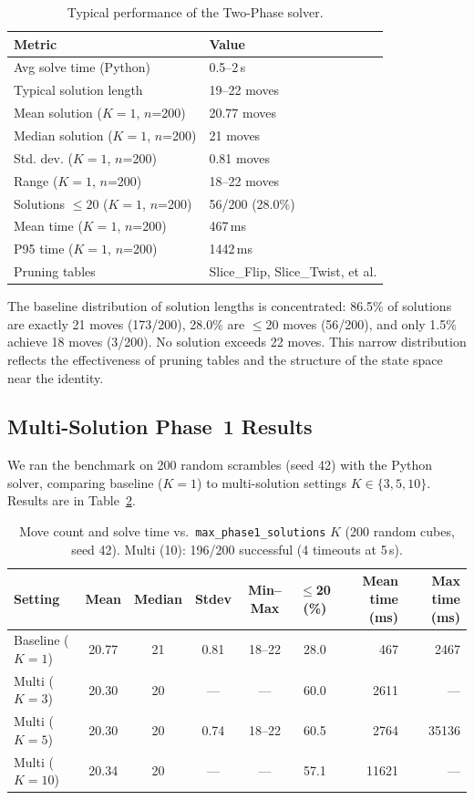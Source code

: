 \documentclass[10pt,twocolumn,a4paper]{article}
\begin{document}
\begin{table}[t]
\centering
\caption{Typical performance of the Two-Phase solver.}
\label{tab:baseline}
\begin{tabular}{@{}ll@{}}
\toprule
\textbf{Metric} & \textbf{Value} \\
\midrule
Avg solve time (Python) & 0.5--2\,s \\
Typical solution length & 19--22 moves \\
Mean solution ($K{=}1$, $n$=200) & 20.77 moves \\
Median solution ($K{=}1$, $n$=200) & 21 moves \\
Std. dev. ($K{=}1$, $n$=200) & 0.81 moves \\
Range ($K{=}1$, $n$=200) & 18--22 moves \\
Solutions $\leq 20$ ($K{=}1$, $n$=200) & 56/200 (28.0\%) \\
Mean time ($K{=}1$, $n$=200) & 467\,ms \\
P95 time ($K{=}1$, $n$=200) & 1442\,ms \\
Pruning tables & Slice\_Flip, Slice\_Twist, et al. \\
\bottomrule
\end{tabular}
\end{table}

The baseline distribution of solution lengths is concentrated: 86.5\% of solutions are exactly 21 moves (173/200), 28.0\% are $\leq$20 moves (56/200), and only 1.5\% achieve 18 moves (3/200). No solution exceeds 22 moves. This narrow distribution reflects the effectiveness of pruning tables and the structure of the state space near the identity.

\subsection{Multi-Solution Phase~1 Results}
\label{sec:multi-results}

We ran the benchmark on 200 random scrambles (seed 42) with the Python solver, comparing baseline ($K=1$) to multi-solution settings $K \in \{3, 5, 10\}$. Results are in Table~\ref{tab:benchmark}.

\begin{table}[t]
\centering
\caption{Move count and solve time vs.\ \texttt{max\_phase1\_solutions} $K$ (200 random cubes, seed 42). Multi (10): 196/200 successful (4 timeouts at 5\,s).}
\label{tab:benchmark}
\begin{tabular}{@{}lcccccrr@{}}
\toprule
\textbf{Setting} & \textbf{Mean} & \textbf{Median} & \textbf{Stdev} & \textbf{Min--Max} & \textbf{$\leq$20 (\%)} & \textbf{Mean time (ms)} & \textbf{Max time (ms)} \\
\midrule
Baseline ($K=1$)  & 20.77 & 21 & 0.81 & 18--22 & 28.0 & 467 & 2467 \\
Multi ($K=3$)     & 20.30 & 20 & --- & --- & 60.0 & 2611 & --- \\
Multi ($K=5$)     & 20.30 & 20 & 0.74 & 18--22 & 60.5 & 2764 & 35136 \\
Multi ($K=10$)    & 20.34 & 20 & --- & --- & 57.1 & 11621 & --- \\
\bottomrule
\end{tabular}
\end{table}
\end{document}
